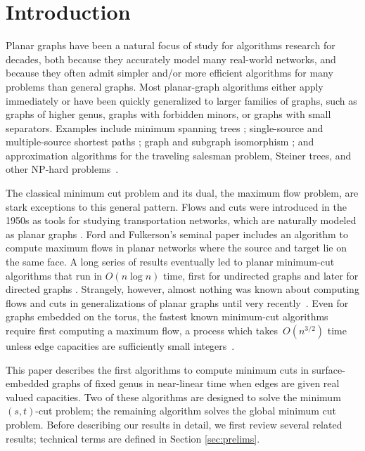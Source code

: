 \section{Introduction}
\label{sec:intro}

Planar graphs have been a natural focus of study for algorithms research for decades, both because they accurately model many real-world networks, and because they often admit simpler and/or more efficient algorithms for many problems than general graphs.  Most planar-graph algorithms either apply immediately or have been quickly generalized to larger families of graphs, such as graphs of higher genus, graphs with forbidden minors, or graphs with small separators.  Examples include minimum spanning trees \cite{p-omst-99, m-tltam-04}; single-source and multiple-source shortest paths \cite{cc-msspg-07, fr-pgnwe-06, hkrs-fspap-97, k-msspp-05, kmw-spdpg-09, lrt-gnd-79, tm-spltm-09}; graph and subgraph isomorphism \cite{g-itegd-00, hw-ltaip-74, m-itgbg-80, e-sipgr-99, e-dtmcg-00}; and approximation algorithms for the traveling salesman problem, Steiner trees, and other NP-hard problems~\cite{bdt-ptass-08, bkk-ptass-07, bkk-stpg-07, dhm-aacd-07, e-dtmcg-00}.

The classical minimum cut problem and its dual, the maximum flow problem, are stark exceptions to this general pattern.  Flows and cuts were introduced in the 1950s as tools for studying transportation networks, which are naturally modeled as planar graphs \cite{hr-fmern-55}.  Ford and Fulkerson's seminal paper \cite{ff-mfn-56} includes an algorithm to compute maximum flows in planar networks where the source and target lie on the same face.  A long series of results eventually led to planar minimum-cut algorithms that run in $O(n\log n)$ time, first for undirected graphs \cite{r-mstcp-83, hj-oamfu-85, f-faspp-87} and later for directed
graphs \cite{jk-mcdpn-92, hkrs-fspap-97}.
Strangely, however, almost nothing was known about computing flows and cuts in generalizations of planar graphs until very recently~\cite{cen-hfcc-12}.
Even for graphs embedded on the torus, the fastest known minimum-cut algorithms require first computing a maximum flow, a process which takes~$O(n^{3/2})$ time unless edge capacities are sufficiently small integers~\cite{cen-hfcc-12}.

This paper describes the first algorithms to compute minimum cuts in surface-embedded graphs of fixed genus in near-linear time when edges are given real valued capacities.
Two of these algorithms are designed to solve the minimum $(s,t)$-cut problem; the remaining algorithm solves the global minimum cut problem.
Before describing our results in detail, we first review several related results; technical terms are defined in Section \ref{sec:prelims}.


